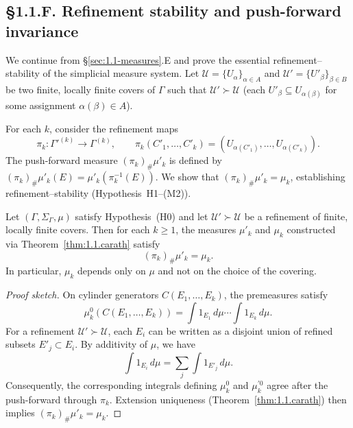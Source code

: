
\subsection*{§1.1.F. Refinement stability and push-forward invariance}

We continue from §\ref{sec:1.1-measures}.E and prove the essential refinement–stability of the simplicial measure system. 
Let $\mathcal U=\{U_\alpha\}_{\alpha\in A}$ and $\mathcal U'=\{U'_\beta\}_{\beta\in B}$ be two finite, locally finite covers of $\Gamma$ such that $\mathcal U'\succ\mathcal U$ (each $U'_\beta\subseteq U_{\alpha(\beta)}$ for some assignment $\alpha(\beta)\in A$). 

For each $k$, consider the refinement maps
\[
\pi_k:\Gamma'^{(k)}\longrightarrow \Gamma^{(k)},\qquad
\pi_k(C'_1,\ldots,C'_k)=(U_{\alpha(C'_1)},\ldots,U_{\alpha(C'_k)}).
\]
The push-forward measure $(\pi_k)_\#\mu'_k$ is defined by $(\pi_k)_\#\mu'_k(E)=\mu'_k(\pi_k^{-1}(E))$. 
We show that $(\pi_k)_\#\mu'_k=\mu_k$, establishing refinement–stability (Hypothesis~H1–(M2)).

\begin{theorem}\label{thm:1.1.stab}
Let $(\Gamma,\Sigma_\Gamma,\mu)$ satisfy Hypothesis~\textup{(H0)} and let $\mathcal U'\succ\mathcal U$ be a refinement of finite, locally finite covers. 
Then for each $k\ge1$, the measures $\mu'_k$ and $\mu_k$ constructed via Theorem~\ref{thm:1.1.carath} satisfy
\[
(\pi_k)_\#\mu'_k=\mu_k.
\]
In particular, $\mu_k$ depends only on $\mu$ and not on the choice of the covering.
\end{theorem}

\begin{proof}[Proof sketch]
On cylinder generators $C(E_1,\ldots,E_k)$, the premeasures satisfy
\[
\mu_k^0(C(E_1,\ldots,E_k))
  =\int 1_{E_1}\,d\mu\cdots\int 1_{E_k}\,d\mu.
\]
For a refinement $\mathcal U'\succ\mathcal U$, each $E_i$ can be written as a disjoint union of refined subsets $E'_j\subset E_i$.
By additivity of $\mu$, we have
\[
\int 1_{E_i}\,d\mu=\sum_j \int 1_{E'_j}\,d\mu.
\]
Consequently, the corresponding integrals defining $\mu_k^0$ and $\mu_k^{\prime0}$ agree after the push-forward through $\pi_k$. 
Extension uniqueness (Theorem~\ref{thm:1.1.carath}) then implies $(\pi_k)_\#\mu'_k=\mu_k$.
\end{proof}

